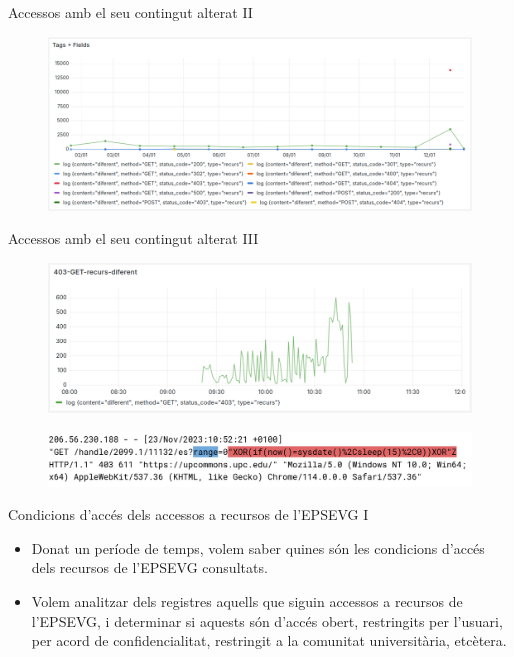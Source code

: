 \begin{frame}{Accessos amb el seu contingut alterat II}
    \begin{figure}
        \includegraphics[width=\textwidth]{figures/possible-attacks}
        \label{fig:use-case-2}

    \end{figure}
\end{frame}

\begin{frame}{Accessos amb el seu contingut alterat III}
    \begin{figure}
        \includegraphics[width=\textwidth]{figures/possible-attacks-403}
        \label{fig:use-case-2-1}
    \end{figure}
    \begin{figure}
        \includegraphics[width=\textwidth]{figures/log-attack}
        \label{fig:use-case-2-2}
    \end{figure}
\end{frame}

\begin{frame}{Condicions d'accés dels accessos a recursos de l'EPSEVG I}
    \begin{itemize}
        \item Donat un període de temps, volem saber quines són les condicions d'accés dels recursos de l'EPSEVG consultats.
        \item Volem analitzar dels registres aquells que siguin accessos a recursos de l'EPSEVG, i determinar si aquests són d'accés obert, restringits per l'usuari, per acord de confidencialitat, restringit a la comunitat universitària, etcètera.
    \end{itemize}
\end{frame}


